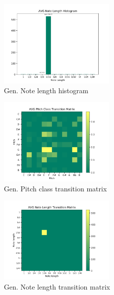 \documentclass[10pt,twocolumn,letterpaper]{article}
\begin{document}
\begin{figure}[!h]
  \centering
  \includegraphics[width = 160pt]{./images/02-abs-gen/6.png}
  \caption{Gen. Note length histogram}
  \label{img:note_length_hist}
\end{figure}

\begin{figure}[!h]
  \centering
  \includegraphics[width = 160pt]{./images/02-abs-gen/9.png}
  \caption{Gen. Pitch class transition matrix}
  \label{img:pitch_class_transition_matrix}
\end{figure}

\begin{figure}[!h]
  \centering
  \includegraphics[width = 160pt]{./images/02-abs-gen/7.png}
  \caption{Gen. Note length transition matrix}
  \label{img:note_length_transition_matrix}
\end{figure}
\end{document}
